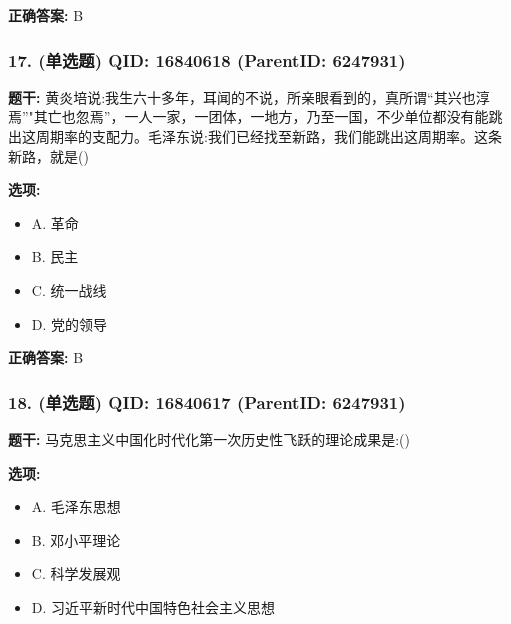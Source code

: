 \documentclass[12pt,UTF8]{ctexart}
\begin{document}
\textbf{正确答案:}
B

\vspace{0.3em}\hrulefill\vspace{0.7em}

\subsubsection*{17. (单选题) \small QID: 16840618 (ParentID: 6247931)}

\textbf{题干:}
黄炎培说:我生六十多年，耳闻的不说，所亲眼看到的，真所谓“其兴也淳焉”"其亡也忽焉”，一人一家，一团体，一地方，乃至一国，不少单位都没有能跳出这周期率的支配力。毛泽东说:我们已经找至新路，我们能跳出这周期率。这条新路，就是()



\textbf{选项:}
\begin{itemize}[leftmargin=*]

  \item A. 革命

  \item B. 民主

  \item C. 统一战线

  \item D. 党的领导

\end{itemize}

\textbf{正确答案:}
B

\vspace{0.3em}\hrulefill\vspace{0.7em}

\subsubsection*{18. (单选题) \small QID: 16840617 (ParentID: 6247931)}

\textbf{题干:}
马克思主义中国化时代化第一次历史性飞跃的理论成果是:()



\textbf{选项:}
\begin{itemize}[leftmargin=*]

  \item A. 毛泽东思想

  \item B. 邓小平理论

  \item C. 科学发展观

  \item D. 习近平新时代中国特色社会主义思想

\end{itemize}
\end{document}
